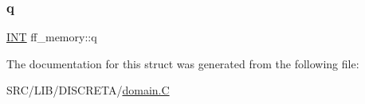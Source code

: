 \mbox{\label{structff__memory_ac1275d48cbb751e258e3b31030e1e9c7}} 
\subsubsection{\texorpdfstring{q}{q}}
{\footnotesize\ttfamily \mbox{\hyperlink{galois_8h_a09fddde158a3a20bd2dcadb609de11dc}{I\+NT}} ff\+\_\+memory\+::q}



The documentation for this struct was generated from the following file\+:\begin{DoxyCompactItemize}
\item 
S\+R\+C/\+L\+I\+B/\+D\+I\+S\+C\+R\+E\+T\+A/\mbox{\hyperlink{domain_8_c}{domain.\+C}}\end{DoxyCompactItemize}
